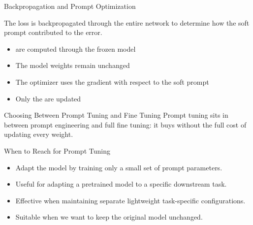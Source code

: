 \documentclass[aspectratio=169,10pt]{beamer}
\begin{document}
\begin{frame}{Backpropagation and Prompt Optimization}
  
  {\raggedright The loss is backpropagated through the entire network to determine how the soft prompt contributed to the error.\par}
  
  \vskip0.12cm
  \begin{itemize}\itemsep4pt
    \item  {} are computed through the frozen model
    \item  The model weights remain unchanged
    \item  The optimizer uses the gradient with respect to the soft prompt
    \item  Only the  are updated
  \end{itemize}
  \vskip0.3cm
  \centering
  \resizebox{0.92\textwidth}{!}{\ptbackpropupdate}
  \vskip0.1cm
  
\end{frame}






\begin{frame}{Choosing Between Prompt Tuning and Fine Tuning}
  \vskip0.2cm
  \small
  Prompt tuning sits in between prompt engineering and full fine tuning: it buys
   without the full cost of updating every weight.
  \vskip0.9cm
  \centering
  \ptspectrum
\end{frame}

\begin{frame}{When to Reach for Prompt Tuning}
  \begin{itemize}\itemsep11pt
    \item {} Adapt the model by training only a small set of prompt parameters.
    \item {} Useful for adapting a pretrained model to a specific downstream task.
    \item {} Effective when maintaining separate lightweight task-specific configurations.
    \item {} Suitable when we want to keep the original model unchanged.
  \end{itemize}
\end{frame}
\end{document}

